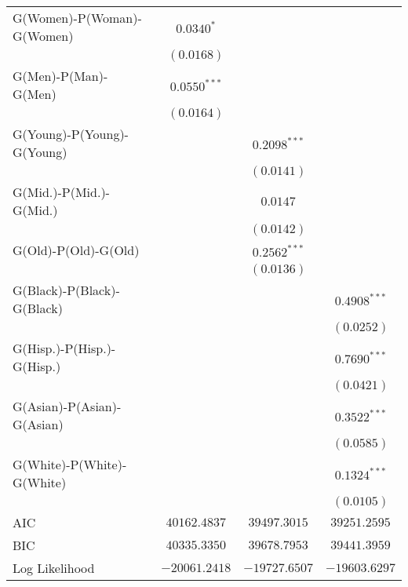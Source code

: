 \begin{center}
\begin{longtable}{l c c c}
G(Women)-P(Woman)-G(Women) & $0.0340^{*}$   &                 &                 \\
                           & $(0.0168)$     &                 &                 \\
G(Men)-P(Man)-G(Men)       & $0.0550^{***}$ &                 &                 \\
                           & $(0.0164)$     &                 &                 \\
G(Young)-P(Young)-G(Young) &                & $0.2098^{***}$  &                 \\
                           &                & $(0.0141)$      &                 \\
G(Mid.)-P(Mid.)-G(Mid.)    &                & $0.0147$        &                 \\
                           &                & $(0.0142)$      &                 \\
G(Old)-P(Old)-G(Old)       &                & $0.2562^{***}$  &                 \\
                           &                & $(0.0136)$      &                 \\
G(Black)-P(Black)-G(Black) &                &                 & $0.4908^{***}$  \\
                           &                &                 & $(0.0252)$      \\
G(Hisp.)-P(Hisp.)-G(Hisp.) &                &                 & $0.7690^{***}$  \\
                           &                &                 & $(0.0421)$      \\
G(Asian)-P(Asian)-G(Asian) &                &                 & $0.3522^{***}$  \\
                           &                &                 & $(0.0585)$      \\
G(White)-P(White)-G(White) &                &                 & $0.1324^{***}$  \\
                           &                &                 & $(0.0105)$      \\
\midrule
AIC                        & $40162.4837$   & $39497.3015$    & $39251.2595$    \\
BIC                        & $40335.3350$   & $39678.7953$    & $39441.3959$    \\
Log Likelihood             & $-20061.2418$  & $-19727.6507$   & $-19603.6297$   \\
\end{longtable}
\end{center}
